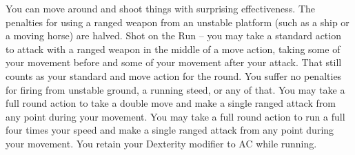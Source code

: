 \combatfeat
{You can move around and shoot things with surprising effectiveness.}
{The penalties for using a ranged weapon from an unstable platform (such as a ship or a moving horse) are halved.}
{Shot on the Run -- you may take a standard action to attack with a ranged weapon in the middle of a move action, taking some of your movement before and some of your movement after your attack. That still counts as your standard and move action for the round.}
{You suffer no penalties for firing from unstable ground, a running steed, or any of that.}
{You may take a full round action to take a double move and make a single ranged attack from any point during your movement.}
{You may take a full round action to run a full four times your speed and make a single ranged attack from any point during your movement. You retain your Dexterity modifier to AC while running.}